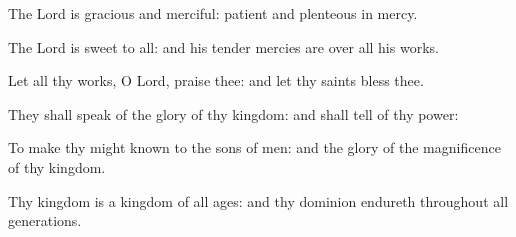 ﻿\item The Lord is gracious and merciful: patient and plenteous in mercy.
\item The Lord is sweet to all: and his tender mercies are over all his works.
\item Let all thy works, O Lord, praise thee: and let thy saints bless thee.
\item They shall speak of the glory of thy kingdom: and shall tell of thy power:
\item To make thy might known to the sons of men: and the glory of the magnificence of thy kingdom.
\item Thy kingdom is a kingdom of all ages: and thy dominion endureth throughout all generations.